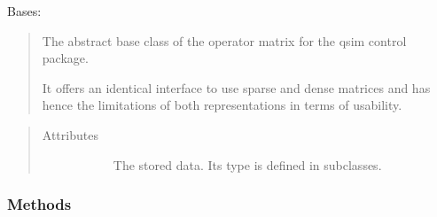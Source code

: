 \documentclass[letterpaper,10pt,english]{sphinxmanual}
\begin{document}
\begin{fulllineitems}
\label{\detokenize{qsim:qsim.matrix.OperatorMatrix}}
Bases: 
\begin{quote}

The abstract base class of the operator matrix for the qsim control
package.

It offers an identical interface to use sparse and dense matrices and has
hence the limitations of both representations in terms of usability.
\end{quote}
\begin{quote}\begin{description}
\item[{Attributes}] \leavevmode\begin{description}
\item[{}] \leavevmode
The stored data. Its type is defined in subclasses.

\end{description}

\end{description}\end{quote}
\subsubsection*{Methods}


\begin{savenotes}\sphinxattablestart
\centering
\begin{tabulary}{\linewidth}[t]{|T|T|}
\hline


\end{tabulary}
\end{savenotes}
\end{fulllineitems}
\end{document}
